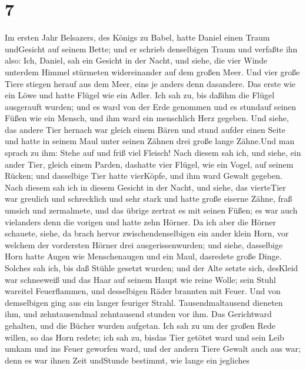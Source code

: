 \hypertarget{section-6}{%
\section{7}\label{section-6}}

 Im ersten Jahr Belsazers, des Königs zu Babel, hatte Daniel
einen Traum undGesicht auf seinem Bette; und er schrieb denselbigen
Traum und verfaßte ihn also:  Ich, Daniel, sah ein Gesicht
in der Nacht, und siehe, die vier Winde unterdem Himmel stürmeten
widereinander auf dem großen Meer.  Und vier große Tiere
stiegen herauf aus dem Meer, eins je anders denn dasandere. 
Das erste wie ein Löwe und hatte Flügel wie ein Adler. Ich sah zu, bis
daßihm die Flügel ausgerauft wurden; und es ward von der Erde genommen
und es stundauf seinen Füßen wie ein Mensch, und ihm ward ein menschlich
Herz gegeben.  Und siehe, das andere Tier hernach war gleich
einem Bären und stund aufder einen Seite und hatte in seinem Maul unter
seinen Zähnen drei große lange Zähne.Und man sprach zu ihm: Stehe auf
und friß viel Fleisch!  Nach diesem sah ich, und siehe, ein
ander Tier, gleich einem Parden, dashatte vier Flügel, wie ein Vogel,
auf seinem Rücken; und dasselbige Tier hatte vierKöpfe, und ihm ward
Gewalt gegeben.  Nach diesem sah ich in diesem Gesicht in
der Nacht, und siehe, das vierteTier war greulich und schrecklich und
sehr stark und hatte große eiserne Zähne, fraß umsich und zermalmete,
und das übrige zertrat es mit seinen Füßen; es war auch vielanders denn
die vorigen und hatte zehn Hörner.  Da ich aber die Hörner
schauete, siehe, da brach hervor zwischendenselbigen ein ander klein
Horn, vor welchem der vordersten Hörner drei ausgerissenwurden; und
siehe, dasselbige Horn hatte Augen wie Menschenaugen und ein Maul,
dasredete große Dinge.  Solches sah ich, bis daß Stühle
gesetzt wurden; und der Alte setzte sich, desKleid war schneeweiß und
das Haar auf seinem Haupt wie reine Wolle; sein Stuhl wareitel
Feuerflammen, und desselbigen Räder brannten mit Feuer. 
Und von demselbigen ging aus ein langer feuriger Strahl.
Tausendmaltausend dieneten ihm, und zehntausendmal zehntausend stunden
vor ihm. Das Gerichtward gehalten, und die Bücher wurden aufgetan.
 Ich sah zu um der großen Rede willen, so das Horn redete;
ich sah zu, bisdas Tier getötet ward und sein Leib umkam und ins Feuer
geworfen ward,  und der andern Tiere Gewalt auch aus war;
denn es war ihnen Zeit undStunde bestimmt, wie lange ein jegliches
